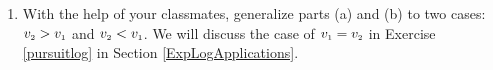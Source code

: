 \documentclass{ximera}
\begin{document}
\begin{enumerate}
\begin{enumerate}
\item  With the help of your classmates, generalize parts (a) and (b) to two cases:  $v_{\mbox{\tiny$2$}} > v_{\mbox{\tiny$1$}}$ and $v_{\mbox{\tiny$2$}} < v_{\mbox{\tiny$1$}}$.   We will discuss the case of $v_{\mbox{\tiny$1$}} = v_{\mbox{\tiny$2$}}$ in Exercise \ref{pursuitlog} in Section \ref{ExpLogApplications}.

\end{enumerate}

\setcounter{HW}{\value{enumi}}
\end{enumerate}
\end{document}
